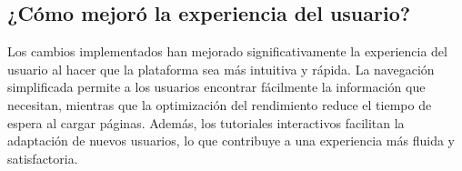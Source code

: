 \documentclass{article}
\begin{document}
\subsection*{¿Cómo mejoró la experiencia del usuario?}

Los cambios implementados han mejorado significativamente la experiencia del usuario al hacer que la plataforma sea más intuitiva y rápida. La navegación simplificada permite a los usuarios encontrar fácilmente la información que necesitan, mientras que la optimización del rendimiento reduce el tiempo de espera al cargar páginas. Además, los tutoriales interactivos facilitan la adaptación de nuevos usuarios, lo que contribuye a una experiencia más fluida y satisfactoria.
\end{document}
